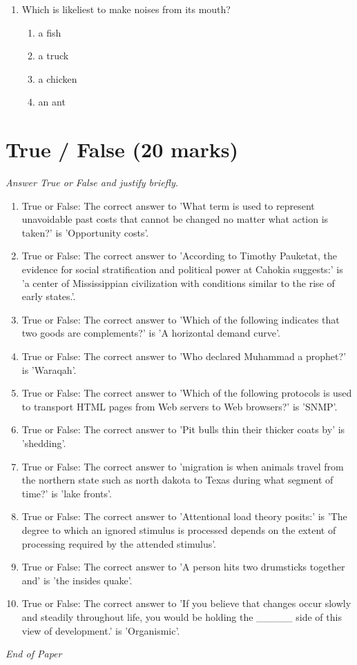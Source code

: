 \documentclass[12pt]{article}
\begin{document}
\begin{enumerate}[label=\arabic*.]
\begin{enumerate}[label=(\alph*)]
    \item unwashed greens
    \item properly cooked beef
    \item washed carrots
\end{enumerate}
\item Which is likeliest to make noises from its mouth?
\begin{enumerate}[label=(\alph*)]
    \item a fish
    \item a truck
    \item a chicken
    \item an ant
\end{enumerate}
\end{enumerate}

\section*{True / False (20 marks)}
\textit{Answer True or False and justify briefly.}
\begin{enumerate}[label=\arabic*.]
\item True or False: The correct answer to 'What term is used to represent unavoidable past costs that cannot be changed no matter what action is taken?' is 'Opportunity costs'.
\item True or False: The correct answer to 'According to Timothy Pauketat, the evidence for social stratification and political power at Cahokia suggests:' is 'a center of Mississippian civilization with conditions similar to the rise of early states.'.
\item True or False: The correct answer to 'Which of the following indicates that two goods are complements?' is 'A horizontal demand curve'.
\item True or False: The correct answer to 'Who declared Muhammad a prophet?' is 'Waraqah'.
\item True or False: The correct answer to 'Which of the following protocols is used to transport HTML pages from Web servers to Web browsers?' is 'SNMP'.
\item True or False: The correct answer to 'Pit bulls thin their thicker coats by' is 'shedding'.
\item True or False: The correct answer to 'migration is when animals travel from the northern state such as north dakota to Texas during what segment of time?' is 'lake fronts'.
\item True or False: The correct answer to 'Attentional load theory posits:' is 'The degree to which an ignored stimulus is processed depends on the extent of processing required by the attended stimulus'.
\item True or False: The correct answer to 'A person hits two drumsticks together and' is 'the insides quake'.
\item True or False: The correct answer to 'If you believe that changes occur slowly and steadily throughout life, you would be holding the \_\_\_\_\_ side of this view of development.' is 'Organismic'.
\end{enumerate}

\vfill
\noindent\textit{End of Paper}
\end{document}
